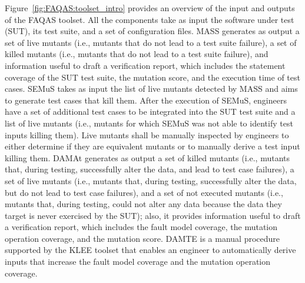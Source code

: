 Figure~\ref{fig:FAQAS:toolset_intro} provides an overview of the input and outputs of the FAQAS toolset. All the components take as input the software under test (SUT), its test suite, and a set of configuration files.
MASS generates as output a set of live mutants (i.e., mutants that do not lead to a test suite failure), a set of killed mutants (i.e., mutants that do not lead to a test suite failure), and information useful to draft a verification report, which includes the statement coverage of the SUT test suite, the mutation score, and the execution time of test cases.
SEMuS takes as input the list of live mutants detected by MASS and aims to generate test cases that kill them. After the
 execution of SEMuS, engineers have a set of additional test cases to be integrated into the SUT test suite and a list of live mutants (i.e., mutants for which SEMuS was not able to identify test inputs killing them). Live mutants shall be manually inspected by engineers to either determine if they are equivalent mutants or to manually derive a test input killing them.
 DAMAt generates as output a set of killed mutants (i.e., mutants that, during testing, successfully alter the data, and lead to test case failures), a set of live mutants (i.e., mutants that, during testing, successfully alter the data, but do not lead to test case failures), and a set of not executed mutants (i.e., mutants that, during testing, could not alter any data because the data they target is never exercised by the SUT); also, it provides information useful to draft a verification report, which includes the fault model coverage, the mutation operation coverage, and the mutation score.
 DAMTE is a manual procedure supported by the KLEE toolset that enables an engineer to automatically derive inputs that increase the fault model coverage and the mutation operation coverage.
